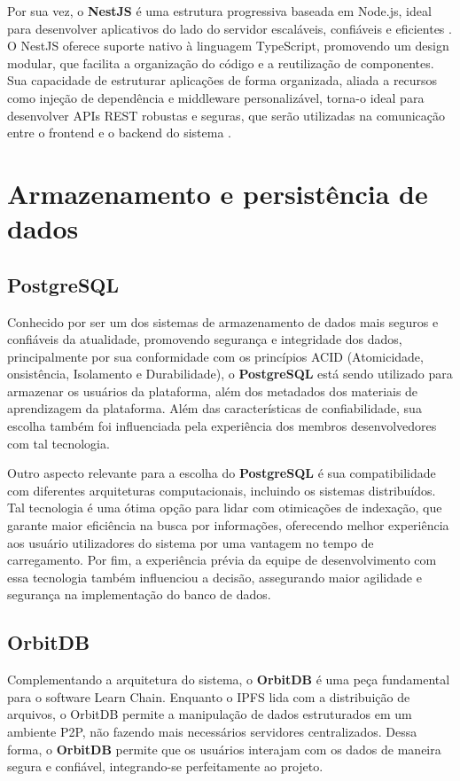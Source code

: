 Por sua vez, o \textbf{NestJS} é uma estrutura progressiva baseada em Node.js, ideal para desenvolver aplicativos do lado do servidor escaláveis, confiáveis e eficientes \cite{nestjs2025}. O NestJS oferece suporte nativo à linguagem TypeScript, promovendo um design modular, que facilita a organização do código e a reutilização de componentes. Sua capacidade de estruturar aplicações de forma organizada, aliada a recursos como injeção de dependência e middleware personalizável, torna-o ideal para desenvolver APIs REST robustas e seguras, que serão utilizadas na comunicação entre o frontend e o backend do sistema \cite{nestjs2025}.

\section{Armazenamento e persistência de dados}

\subsection{PostgreSQL}

Conhecido por ser um dos sistemas de armazenamento de dados mais seguros e confiáveis da atualidade, promovendo segurança e integridade dos dados, principalmente por sua conformidade com os princípios ACID (Atomicidade, onsistência, Isolamento e Durabilidade), o \textbf{PostgreSQL} está sendo utilizado para armazenar os usuários da plataforma, além dos metadados dos materiais de aprendizagem da plataforma. Além das características de confiabilidade, sua escolha também foi influenciada pela experiência dos membros desenvolvedores com tal tecnologia.

Outro aspecto relevante para a escolha do \textbf{PostgreSQL} é sua compatibilidade com diferentes arquiteturas computacionais, incluindo os sistemas distribuídos. Tal tecnologia é uma ótima opção para lidar com otimicações de indexação, que garante maior eficiência na busca por informações, oferecendo melhor experiência aos usuário utilizadores do sistema por uma vantagem no tempo de carregamento. Por fim, a experiência prévia da equipe de desenvolvimento com essa tecnologia também influenciou a decisão, assegurando maior agilidade e segurança na implementação do banco de dados.

\subsection{OrbitDB}

Complementando a arquitetura do sistema, o \textbf{OrbitDB} é uma peça fundamental para o software Learn Chain. Enquanto o IPFS lida com a distribuição de arquivos, o OrbitDB permite a manipulação de dados estruturados em um ambiente P2P, não fazendo mais necessários servidores centralizados. Dessa forma, o \textbf{OrbitDB} permite que os usuários interajam com os dados de maneira segura e confiável, integrando-se perfeitamente ao projeto.

